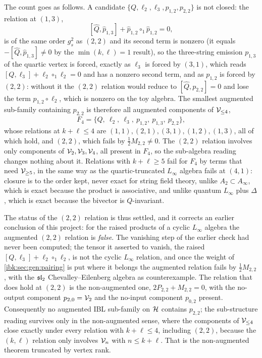 The count goes as follows. A candidate $\{Q,\ell_2,\ell_3,p_{1,2},p_{2,2}\}$ is not closed: the relation at $(1,3)$,
\begin{equation}
  \label{ibk:eq:senses:13}
  [\hat Q,\hat p_{1,3}]+\hat p_{1,2}\circ_1\hat p_{1,2}
    = 0,
\end{equation}
is of the same order $g_s^2$ as $(2,2)$ and its second term is nonzero (it equals $-[\hat Q,\hat p_{1,3}]\neq0$ by the $\min(k,\ell)=1$ result), so the three-string emission $p_{1,3}$ of the quartic vertex is forced, exactly as $\ell_3$ is forced by $(3,1)$, which reads $[Q,\ell_3]+\ell_2\circ_1\ell_2=0$ and has a nonzero second term, and as $p_{1,2}$ is forced by $(2,2)$: without it the $(2,2)$ relation would reduce to $[\hat Q,p_{2,2}]=0$ and lose the term $p_{1,2}\circ\ell_2$, which is nonzero on the toy algebra. The smallest augmented sub-family containing $p_{2,2}$ is therefore all augmented components of ${\mathcal{V}}_{\le4}$,
\begin{equation}
  \label{ibk:eq:senses:F4}
  F_4
    = \{Q,\ \ell_2,\ \ell_3,\ p_{1,2},\ p_{1,3},\ p_{2,2}\},
\end{equation}
whose relations at $k+\ell\le4$ are $(1,1),(2,1),(3,1),(1,2),(1,3)$, all of which hold, and $(2,2)$, which fails by $\frac12M_{2,2}\neq0$. The $(2,2)$ relation involves only components of ${\mathcal{V}}_2,{\mathcal{V}}_3,{\mathcal{V}}_4$, all present in $F_4$, so the sub-algebra reading changes nothing about it. Relations with $k+\ell\ge5$ fail for $F_4$ by terms that need ${\mathcal{V}}_{\ge5}$, in the same way as the quartic-truncated $L_\infty$ algebra fails at $(4,1)$: closure is to the order kept, never exact for string field theory, unlike $A_2\subset A_\infty$, which is exact because the product is associative, and unlike quantum $L_\infty$ plus $\Delta$, which is exact because the bivector is $Q$-invariant.

The status of the $(2,2)$ relation is thus settled, and it corrects an earlier conclusion of this project: for the raised products of a cyclic $L_\infty$ algebra the augmented $(2,2)$ relation is \emph{false}. The vanishing step of the earlier check had never been computed; the tensor it asserted to vanish, the raised $[Q,\ell_3]+\ell_2\circ_1\ell_2$, is not the cyclic $L_\infty$ relation, and once the weight of \cref{ibk:sec:gen:pairing} is put where it belongs the augmented relation fails by $\frac12M_{2,2}$, with the $\mathfrak{sl}_2$ Chevalley--Eilenberg algebra as counterexample. The relation that does hold at $(2,2)$ is the non-augmented one, $2P_{2,2}+M_{2,2}=0$, with the no-output component $p_{2,0}={\mathcal{V}}_2$ and the no-input component $p_{0,2}$ present. Consequently no augmented IBL sub-family on ${\mathcal{H}}$ contains $p_{2,2}$; the sub-structure reading survives only in the non-augmented sense, where the components of ${\mathcal{V}}_{\le4}$ close exactly under every relation with $k+\ell\le4$, including $(2,2)$, because the $(k,\ell)$ relation only involves ${\mathcal{V}}_n$ with $n\le k+\ell$. That is the non-augmented theorem truncated by vertex rank.

